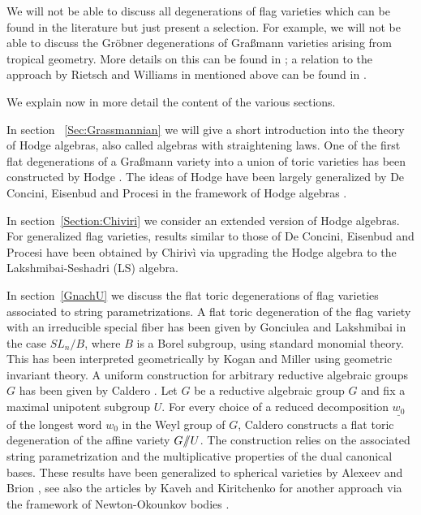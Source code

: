 \documentclass{emsprocart}
\theoremstyle{definition}
\begin{document}
We will not be able to discuss all degenerations of flag varieties which can be found in the literature
but just present a selection. For example, 
we will not be able to discuss the Gr\"obner degenerations of Gra\ss mann 
varieties arising from tropical geometry. More details on this can be found in \cite{SS}; 
a relation to the approach by Rietsch and Williams 
in \cite{RW} mentioned above can be found in \cite{BFFHL}.


We explain now in more detail the content of the various sections.
\par
In section ~\ref{Sec:Grassmannian} we will give a short introduction into the theory of Hodge algebras, also called algebras 
with straightening laws.
One of the first flat degenerations of a Gra\ss mann variety into a union of toric varieties has been constructed by Hodge \cite{Hodge}.
The ideas of Hodge have been largely generalized by De Concini, Eisenbud and Procesi in the framework of Hodge algebras 
\cite{DEP}.
\par
In section~\ref{Section:Chiviri} we consider an extended version of Hodge algebras.
For generalized flag varieties,  results similar to those of De Concini, Eisenbud and Procesi 
have been obtained by Chiriv\`i \cite{Ch1} via upgrading the Hodge algebra to the Lakshmibai-Seshadri (LS) algebra.
\par
In section~\ref{GnachU} we discuss the flat toric degenerations of flag varieties associated to string parametrizations.
A flat toric degeneration of the flag variety with an irreducible special fiber has been 
given by Gonciulea and Lakshmibai \cite{GL} in the case $SL_n/B$, 
where $B$ is a Borel subgroup, using standard monomial theory. This has been interpreted geometrically by Kogan and Miller \cite{KM} 
using geometric invariant theory. A uniform construction for arbitrary reductive algebraic groups $G$ has been given
by Caldero \cite{Ca1}. Let $G$ be a reductive algebraic group $G$ and fix a maximal unipotent subgroup $U$.
For every choice of a reduced decomposition $\underline{w_0}$ of the longest word $w_0$ in the Weyl group of $G$,
Caldero constructs a flat toric degeneration of the affine variety $G/\hskip -3.5pt/U$. 
The construction relies on the associated string parametrization and the multiplicative properties of the dual canonical bases. 
These results have been generalized to spherical varieties by Alexeev and Brion \cite{AB}, see also the articles by Kaveh
and Kiritchenko \cite{K1, Ki} for another 
approach via the framework of Newton-Okounkov bodies \cite{KK}.
\par
\end{document}

